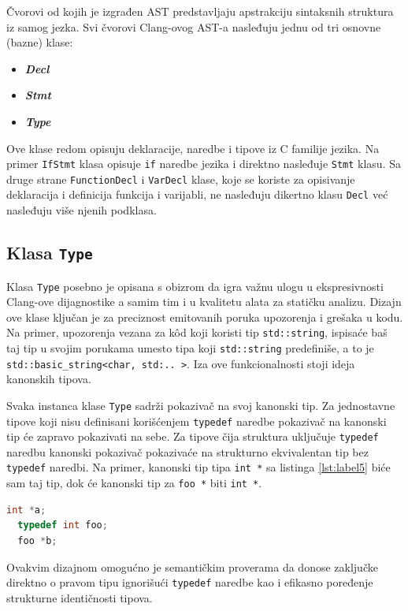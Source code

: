\documentclass[12pt,oneside]{memoir}
\begin{document}
\v{C}vorovi od kojih je izgrađen AST predstavljaju apstrakciju sintaksnih struktura iz samog jezka.
Svi \v{c}vorovi Clang-ovog AST-a nasleđuju jednu od tri osnovne (bazne) klase:
\begin{itemize}
  \item \textit{\textbf{Decl}}
  \item \textit{\textbf{Stmt}}
  \item \textit{\textbf{Type}}
\end{itemize}
Ove klase redom opisuju deklaracije, naredbe i tipove iz C familije jezika.
Na primer \texttt{IfStmt} klasa opisuje \texttt{if} naredbe jezika i direktno nasleđuje \texttt{Stmt} klasu. Sa druge strane \texttt{FunctionDecl} i \texttt{VarDecl} klase, koje se koriste za opisivanje deklaracija i definicija funkcija i varijabli, ne nasleđuju dikertno klasu \texttt{Decl} ve\'{c} nasleđuju vi\v{s}e njenih podklasa.

\subsection{Klasa \texttt{Type}}
  Klasa \texttt{Type} posebno je opisana s obizrom da igra va\v{z}nu ulogu u ekspresivnosti Clang-ove dijagnostike a samim tim i u kvalitetu alata za stati\v{c}ku analizu. Dizajn ove klase klju\v{c}an je za preciznost emitovanih poruka upozorenja i gre\v{s}aka u kodu. Na primer, upozorenja vezana za k\^{o}d  koji koristi tip \texttt{std::string}, ispisa\'{c}e ba\v{s} taj tip u svojim porukama umesto tipa koji \texttt{std::string} predefini\v{s}e, a to je \texttt{std::basic\_string<char, std:.. >}. Iza ove funkcionalnosti stoji ideja kanonskih tipova.
  
  \par
  Svaka instanca klase \texttt{Type} sadr\v{z}i pokaziva\v{c} na svoj kanonski tip. Za jednostavne tipove koji nisu definisani kori\v{s}\'{c}enjem \texttt{typedef} naredbe pokaziva\v{c} na kanonski tip \'{c}e zapravo pokazivati na sebe. Za tipove \v{c}ija struktura uklju\v{c}uje \texttt{typedef} naredbu kanonski pokaziva\v{c} pokaziva\'{c}e na strukturno ekvivalentan tip bez \texttt{typedef} naredbi.
  Na primer, kanonski tip tipa \texttt{int *} sa listinga \ref{lst:label5}  bi\'{c}e sam taj tip, dok \'{c}e kanonski tip za \texttt{foo *} biti \texttt{int *}.

\begin{lstlisting}[style=customc, caption={Demonstracija kanonskih tipova},label=lst:label5,language=C++, captionpos=b]
  int *a;
  typedef int foo;
  foo *b;
\end{lstlisting}
  Ovakvim dizajnom omogu\'{c}no je semanti\v{c}kim proverama da donose zaklju\v{c}ke direktno o pravom tipu ignori\v{s}u\'{c}i \texttt{typedef} naredbe kao i efikasno poređenje strukturne identi\v{c}nosti tipova.
\end{document}
